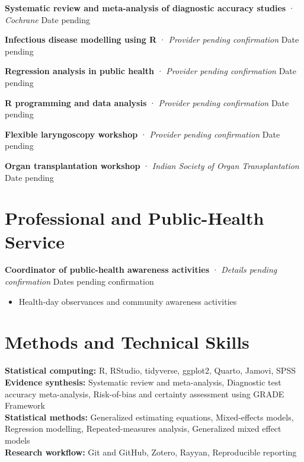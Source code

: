\documentclass[
  english,
  10pt,
]{article}
\providecommand{\tightlist}{%
  \setlength{\itemsep}{0pt}\setlength{\parskip}{0pt}}
\begin{document}
\textbf{Systematic review and meta-analysis of diagnostic accuracy
studies} · \emph{Cochrane} \textbar{} Date pending

\textbf{Infectious disease modelling using R} · \emph{Provider pending
confirmation} \textbar{} Date pending

\textbf{Regression analysis in public health} · \emph{Provider pending
confirmation} \textbar{} Date pending

\textbf{R programming and data analysis} · \emph{Provider pending
confirmation} \textbar{} Date pending

\textbf{Flexible laryngoscopy workshop} · \emph{Provider pending
confirmation} \textbar{} Date pending

\textbf{Organ transplantation workshop} · \emph{Indian Society of Organ
Transplantation} \textbar{} Date pending

\section{Professional and Public-Health Service}

\textbf{Coordinator of public-health awareness activities} ·
\emph{Details pending confirmation} \textbar{} Dates pending
confirmation

\begin{itemize}
\tightlist
\item
  Health-day observances and community awareness activities
\end{itemize}

\section{Methods and Technical Skills}

\textbf{Statistical computing:} R, RStudio, tidyverse, ggplot2, Quarto,
Jamovi, SPSS\\
\textbf{Evidence synthesis:} Systematic review and meta-analysis,
Diagnostic test accuracy meta-analysis, Risk-of-bias and certainty
assessment using GRADE Framework\\
\textbf{Statistical methods:} Generalized estimating equations,
Mixed-effects models, Regression modelling, Repeated-measures analysis,
Generalized mixed effect models\\
\textbf{Research workflow:} Git and GitHub, Zotero, Rayyan, Reproducible
reporting
\end{document}
